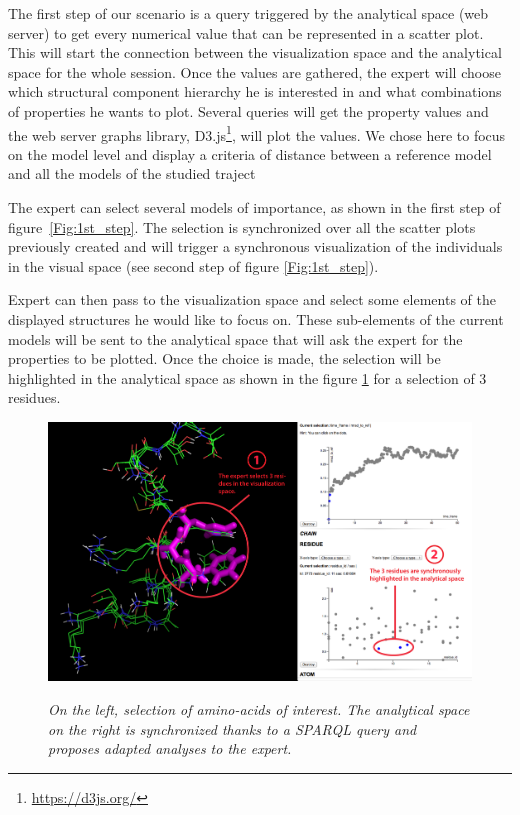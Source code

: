 \documentclass{vgtc}                          %
\begin{document}
The first step of our scenario is a query triggered by the analytical space (web server) to get every numerical value that can be represented in a scatter plot. This will start the connection between the visualization space and the analytical space for the whole session. 
Once the values are gathered, the expert will choose which structural component hierarchy he is interested in and what combinations of properties he wants to plot. Several queries will get the property values and the web server graphs library, D3.js\footnote{\url{https://d3js.org/}}, will plot the values. We chose here to focus on the model level and display a criteria of distance between a reference model and all the models of the studied traject

The expert can select several models of importance, as shown in the first step of figure~\ref{Fig:1st_step}. The selection is synchronized over all the scatter plots previously created and will trigger a synchronous visualization of the individuals in the visual space (see second step of figure \ref{Fig:1st_step}).

Expert can then pass to the visualization space and select some elements of the displayed structures he would like to focus on. These sub-elements of the current models will be sent to the analytical space that will ask the expert for the properties to be plotted. Once the choice is made, the selection will be highlighted in the analytical space as shown in the figure \ref{Fig:2nd_step} for a selection of 3 residues.

\begin{figure}[!htb]
  \centering
  {\includegraphics[width=\linewidth,frame]{./figures/scenario_step_2_cropped}}
    \caption[]{{\it On the left, selection of amino-acids of interest. The analytical space on the right is synchronized thanks to a SPARQL query and proposes adapted analyses to the expert.}}
  \label{Fig:2nd_step}
\end{figure}
\end{document}
